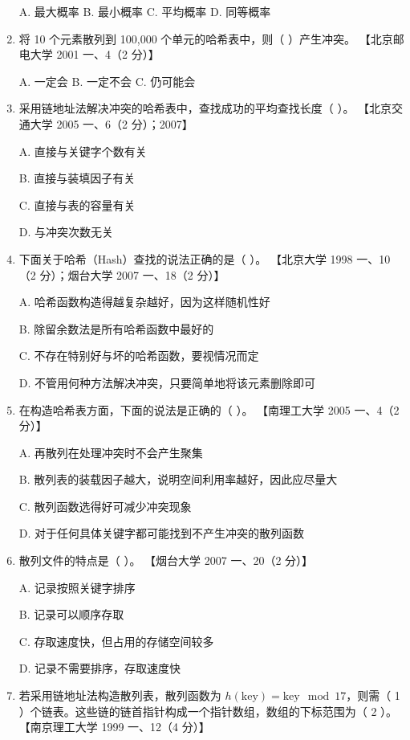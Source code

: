 \documentclass[lang=cn,newtx,10pt,scheme=chinese]{elegantbook}
\begin{document}
\begin{enumerate}
    A. 最大概率 \quad B. 最小概率 \quad C. 平均概率 \quad D. 同等概率  

    \item 将 10 个元素散列到 100,000 个单元的哈希表中，则（ ）产生冲突。  
    【北京邮电大学 2001 一、4（2 分）】  

    A. 一定会 \quad B. 一定不会 \quad C. 仍可能会  

    \item 采用链地址法解决冲突的哈希表中，查找成功的平均查找长度（ ）。  
    【北京交通大学 2005 一、6（2 分）；2007】  

    A. 直接与关键字个数有关  

    B. 直接与装填因子有关  

    C. 直接与表的容量有关  

    D. 与冲突次数无关  

    \item 下面关于哈希（Hash）查找的说法正确的是（ ）。  
    【北京大学 1998 一、10（2 分）；烟台大学 2007 一、18（2 分）】  

    A. 哈希函数构造得越复杂越好，因为这样随机性好  

    B. 除留余数法是所有哈希函数中最好的  

    C. 不存在特别好与坏的哈希函数，要视情况而定  

    D. 不管用何种方法解决冲突，只要简单地将该元素删除即可  

    \item 在构造哈希表方面，下面的说法是正确的（ ）。  
    【南理工大学 2005 一、4（2 分）】  

    A. 再散列在处理冲突时不会产生聚集  

    B. 散列表的装载因子越大，说明空间利用率越好，因此应尽量大  

    C. 散列函数选得好可减少冲突现象  

    D. 对于任何具体关键字都可能找到不产生冲突的散列函数  

    \item 散列文件的特点是（ ）。  
    【烟台大学 2007 一、20（2 分）】 

    A. 记录按照关键字排序  

    B. 记录可以顺序存取  

    C. 存取速度快，但占用的存储空间较多  

    D. 记录不需要排序，存取速度快  

    \item 若采用链地址法构造散列表，散列函数为 $h(\text{key}) = \text{key} \mod 17$，则需（ 1 ）个链表。这些链的链首指针构成一个指针数组，数组的下标范围为（ 2 ）。  
    【南京理工大学 1999 一、12（4 分）】 


\end{enumerate}
\end{document}
